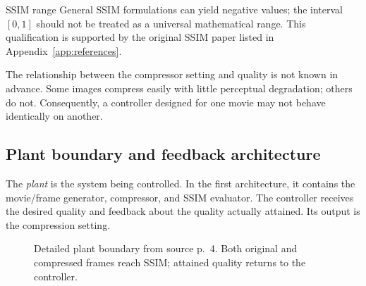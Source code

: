 \documentclass[11pt,a4paper]{article}
\numberwithin{equation}{section}
\numberwithin{figure}{section}
\numberwithin{table}{section}
\begin{document}
\begin{supplementary}{SSIM range}
General SSIM formulations can yield negative values; the interval $[0,1]$ should not be treated as a universal mathematical range. This qualification is supported by the original SSIM paper listed in Appendix~\ref{app:references}.
\end{supplementary}

The relationship between the compressor setting and quality is not known in advance. Some images compress easily with little perceptual degradation; others do not. Consequently, a controller designed for one movie may not behave identically on another.

\subsection{Plant boundary and feedback architecture}
The \emph{plant} is the system being controlled. In the first architecture, it contains the movie/frame generator, compressor, and SSIM evaluator. The controller receives the desired quality and feedback about the quality actually attained. Its output is the compression setting.

\begin{figure}[htbp]\centering
{}
\caption{Detailed plant boundary from source p.\ 4. Both original and compressed frames reach SSIM; attained quality returns to the controller.}
\label{fig:compressor}
\end{figure}
\end{document}
